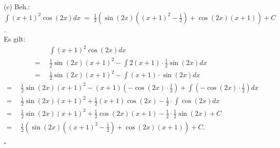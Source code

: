 \documentclass[12pt]{article}
\newcommand{\QED}{\begin{flushright} $\square$ \end{flushright}}
\begin{document}
\begin{enumerate}
	\item[(c)] Beh.: ${\displaystyle \int (x+1)^2 \cos(2x) dx \; = \; \frac{1}{2}\left(\sin(2x)\left((x+1)^2 - \frac{1}{2} \right) + \cos(2x)(x+1)\right) + C }$. \\
	Es gilt:
	\begin{align*}
		&\int (x+1)^2\cos(2x) dx \\
		= \enspace &\frac{1}{2}\sin(2x)(x+1)^2 - \int 2(x+1) \cdot \frac{1}{2} \sin(2x) dx \\
		= \enspace &\frac{1}{2}\sin(2x)(x+1)^2 - \int (x+1) \cdot \sin(2x) dx 
	\end{align*}
	\begin{align*}
		= \enspace &\frac{1}{2}\sin(2x)(x+1)^2 - (x+1)(-\cos(2x) \cdot \frac{1}{2}) + \int (-\cos(2x) \cdot \frac{1}{2}) dx \\
		= \enspace &\frac{1}{2}\sin(2x)(x+1)^2 + \frac{1}{2} (x+1)\cos(2x) - \frac{1}{2} \cdot \int \cos(2x) dx \\
		= \enspace &\frac{1}{2}\sin(2x)(x+1)^2 + \frac{1}{2} \cos(2x)(x+1) - \frac{1}{2} \cdot \frac{1}{2} \sin(2x) + C \\
		= \enspace &\frac{1}{2}\left(\sin(2x)\left((x+1)^2 - \frac{1}{2} \right) + \cos(2x)(x+1)\right) + C.
	\end{align*}
	\QED
\end{enumerate}
\end{document}
